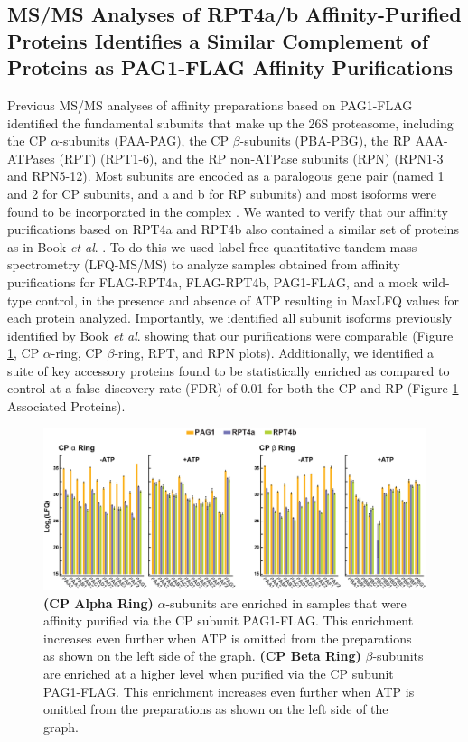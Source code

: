 \subsection{MS/MS Analyses of RPT4a/b Affinity-Purified Proteins Identifies a Similar Complement of Proteins as PAG1-FLAG Affinity Purifications}
	Previous MS/MS analyses of affinity preparations based on PAG1-FLAG identified the fundamental subunits that make up the 26S proteasome, including the CP $\alpha$-subunits (PAA-PAG), the CP $\beta$-subunits (PBA-PBG), the RP AAA-ATPases (RPT) (RPT1-6), and the RP non-ATPase subunits (RPN) (RPN1-3 and RPN5-12). Most subunits are encoded as a paralogous gene pair (named 1 and 2 for CP subunits, and a and b for RP subunits) and most isoforms were found to be incorporated in the complex \citep{book10}. We wanted to verify that our affinity purifications based on RPT4a and RPT4b also contained a similar set of proteins as in Book \textit{et al}. \citep{book10}. To do this we used label-free quantitative tandem mass spectrometry (LFQ-MS/MS) to analyze samples obtained from affinity purifications for FLAG-RPT4a, FLAG-RPT4b, PAG1-FLAG, and a mock wild-type control, in the presence and absence of ATP resulting in MaxLFQ values \citep{cox14} for each protein analyzed. Importantly, we identified all subunit isoforms previously identified by Book \textit{et al}. \citep{book10} showing that our purifications were comparable (Figure \ref{fig:MSCP}, CP $\alpha$-ring, CP $\beta$-ring, RPT, and RPN plots).  Additionally, we identified a suite of key accessory proteins found to be statistically enriched as compared to control at a false discovery rate (FDR) of 0.01 for both the CP and RP (Figure \ref{fig:MSCP} Associated Proteins).

\begin{figure}
	\centering
	\includegraphics[width=\columnwidth]{Proteasome/MSCP.png}
	{\textbf{(CP Alpha Ring)} $\alpha$-subunits are enriched in samples that were affinity purified via the CP subunit PAG1-FLAG. This enrichment increases even further when ATP is omitted from the preparations as shown on the left side of the graph. \textbf{(CP Beta Ring)} $\beta$-subunits are enriched at a higher level when purified via the CP subunit PAG1-FLAG. This enrichment increases even further when ATP is omitted from the preparations as shown on the left side of the graph.}
	\label{fig:MSCP}
\end{figure}

